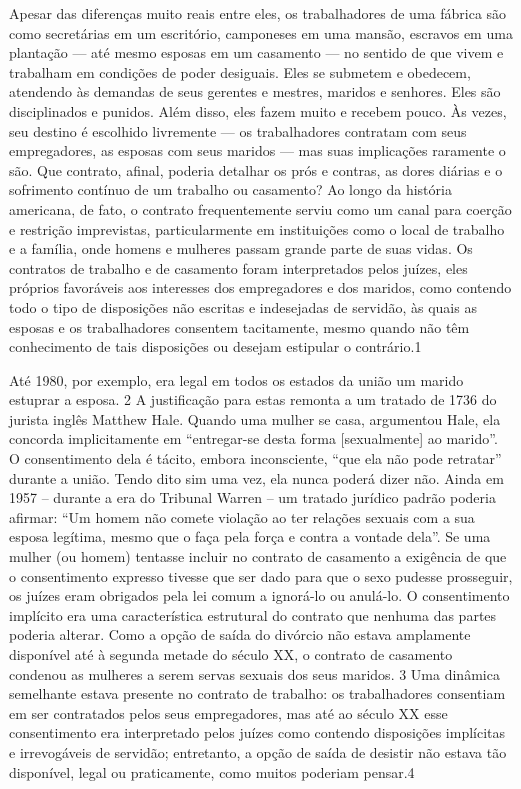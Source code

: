  \par 
Apesar das diferenças muito reais entre eles, os trabalhadores de uma fábrica são como secretárias em um escritório, camponeses em uma mansão, escravos em uma plantação — até mesmo esposas em um casamento — no sentido de que vivem e trabalham em condições de poder desiguais. Eles se submetem e obedecem, atendendo às demandas de seus gerentes e mestres, maridos e senhores. Eles são disciplinados e punidos. Além disso, eles fazem muito e recebem pouco. Às vezes, seu destino é escolhido livremente — os trabalhadores contratam com seus empregadores, as esposas com seus maridos — mas suas implicações raramente o são. Que contrato, afinal, poderia detalhar os prós e contras, as dores diárias e o sofrimento contínuo de um trabalho ou casamento? Ao longo da história americana, de fato, o contrato frequentemente serviu como um canal para coerção e restrição imprevistas, particularmente em instituições como o local de trabalho e a família, onde homens e mulheres passam grande parte de suas vidas. Os contratos de trabalho e de casamento foram interpretados pelos juízes, eles próprios favoráveis ​​aos interesses dos empregadores e dos maridos, como contendo todo o tipo de disposições não escritas e indesejadas de servidão, às quais as esposas e os trabalhadores consentem tacitamente, mesmo quando não têm conhecimento de tais disposições ou desejam estipular o contrário.{\color{blue}1}
 \par 
Até 1980, por exemplo, era legal em todos os estados da união um marido estuprar a esposa. {\color{blue}2} A justificação para estas remonta a um tratado de 1736 do jurista inglês Matthew Hale. Quando uma mulher se casa, argumentou Hale, ela concorda implicitamente em “entregar-se desta forma [sexualmente] ao marido”. O consentimento dela é tácito, embora inconsciente, “que ela não pode retratar” durante a união. Tendo dito sim uma vez, ela nunca poderá dizer não. Ainda em 1957 – durante a era do Tribunal Warren – um tratado jurídico padrão poderia afirmar: “Um homem não comete violação ao ter relações sexuais com a sua esposa legítima, mesmo que o faça pela força e contra a vontade dela”. Se uma mulher (ou homem) tentasse incluir no contrato de casamento a exigência de que o consentimento expresso tivesse que ser dado para que o sexo pudesse prosseguir, os juízes eram obrigados pela lei comum a ignorá-lo ou anulá-lo. O consentimento implícito era uma característica estrutural do contrato que nenhuma das partes poderia alterar. Como a opção de saída do divórcio não estava amplamente disponível até à segunda metade do século XX, o contrato de casamento condenou as mulheres a serem servas sexuais dos seus maridos. {\color{blue}3} Uma dinâmica semelhante estava presente no contrato de trabalho: os trabalhadores consentiam em ser contratados pelos seus empregadores, mas até ao século XX esse consentimento era interpretado pelos juízes como contendo disposições implícitas e irrevogáveis ​​de servidão; entretanto, a opção de saída de desistir não estava tão disponível, legal ou praticamente, como muitos poderiam pensar.{\color{blue}4}

